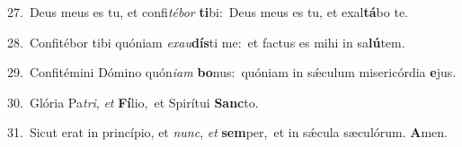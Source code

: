 {\numbfont\textcolor{\numbcolor}{27.}}~Deus meus es tu, et confi\-\textit{té}\-\textit{bor} \textbf{ti}\-bi:~\star Deus meus es tu, et exal\-\textbf{tá}\-bo te.\par
{\numbfont\textcolor{\numbcolor}{28.}}~Confitébor tibi quóniam \textit{ex}\-\textit{au}\textbf{dís}ti me:~\star et factus es mihi in sa\-\textbf{lú}\-tem.\par
{\numbfont\textcolor{\numbcolor}{29.}}~Confitémini Dómino quón\-\textit{i}\-\textit{am} \textbf{bo}\-nus:~\star quóniam in sǽculum misericórdia \textbf{e}\-jus.\par
{\numbfont\textcolor{\numbcolor}{30.}}~Glória Pa\-\textit{tri}\-, \textit{et} \textbf{Fí}\-lio,~\star et Spirítui \textbf{Sanc}\-to.\par
{\numbfont\textcolor{\numbcolor}{31.}}~Sicut erat in princípio, et \textit{nunc}\-, \textit{et} \textbf{sem}\-per,~\star et in sǽcula sæculórum. \textbf{A}\-men.\par
